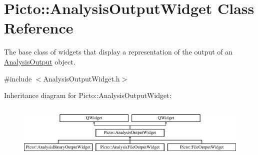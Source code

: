 \hypertarget{class_picto_1_1_analysis_output_widget}{\section{Picto\-:\-:Analysis\-Output\-Widget Class Reference}
\label{class_picto_1_1_analysis_output_widget}
}


The base class of widgets that display a representation of the output of an \hyperlink{class_picto_1_1_analysis_output}{Analysis\-Output} object.  




{\ttfamily \#include $<$Analysis\-Output\-Widget.\-h$>$}

Inheritance diagram for Picto\-:\-:Analysis\-Output\-Widget\-:\begin{figure}[H]
\begin{center}
\leavevmode
\includegraphics[height=2.616822cm]{class_picto_1_1_analysis_output_widget}
\end{center}
\end{figure}
